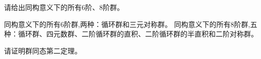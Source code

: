 \documentclass[a4paper, justified]{tufte-handout}
\begin{document}
\begin{problem}[6、8阶群]
请给出同构意义下的所有6阶、8阶群。
\end{problem}

\begin{solution}
	同构意义下的所有6阶群,两种：循环群和三元对称群。
	同构意义下的所有8阶群,五种：循环群、四元数群、二阶循环群的直积、二阶循环群的半直积和二阶对称群。
\end{solution}

\beginot
\begin{ot}[群同态第二定理]
	请证明群同态第二定理。
\end{ot}


\end{document}
